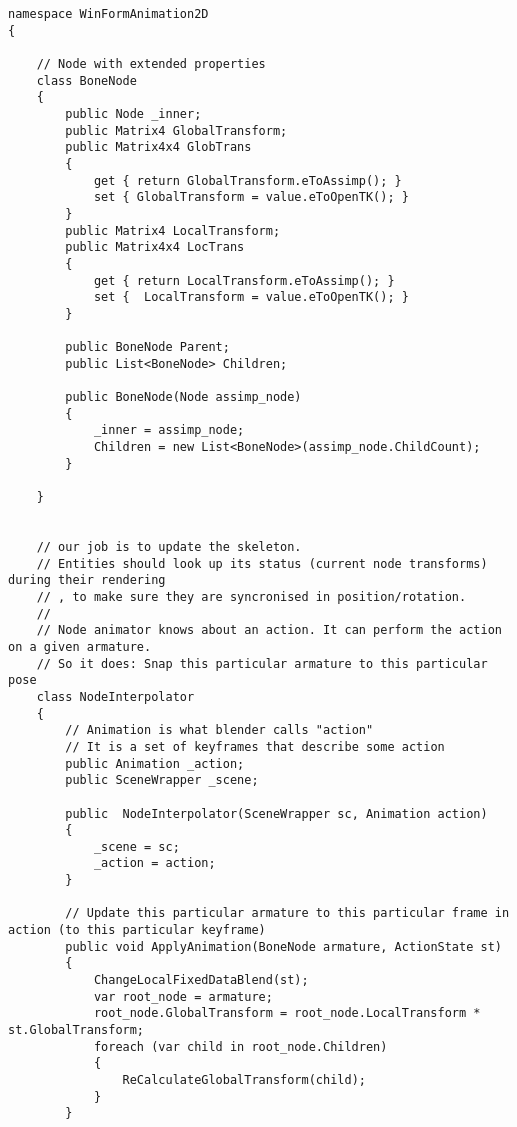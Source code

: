 \begin{scriptsize}
\begin{verbatim}
namespace WinFormAnimation2D
{

    // Node with extended properties
    class BoneNode
    {
        public Node _inner;
        public Matrix4 GlobalTransform;
        public Matrix4x4 GlobTrans
        {
            get { return GlobalTransform.eToAssimp(); }
            set { GlobalTransform = value.eToOpenTK(); }
        }
        public Matrix4 LocalTransform;
        public Matrix4x4 LocTrans
        {
            get { return LocalTransform.eToAssimp(); }
            set {  LocalTransform = value.eToOpenTK(); }
        }

        public BoneNode Parent;
        public List<BoneNode> Children;

        public BoneNode(Node assimp_node)
        {
            _inner = assimp_node;
            Children = new List<BoneNode>(assimp_node.ChildCount);
        }

    }


    // our job is to update the skeleton. 
    // Entities should look up its status (current node transforms) during their rendering
    // , to make sure they are syncronised in position/rotation.
    //
    // Node animator knows about an action. It can perform the action on a given armature.
    // So it does: Snap this particular armature to this particular pose
    class NodeInterpolator
    {
        // Animation is what blender calls "action"
        // It is a set of keyframes that describe some action
        public Animation _action;
        public SceneWrapper _scene;

        public  NodeInterpolator(SceneWrapper sc, Animation action)
        {
            _scene = sc;
            _action = action;
        }

        // Update this particular armature to this particular frame in action (to this particular keyframe)
        public void ApplyAnimation(BoneNode armature, ActionState st)
        {
            ChangeLocalFixedDataBlend(st);
            var root_node = armature;
            root_node.GlobalTransform = root_node.LocalTransform * st.GlobalTransform;
            foreach (var child in root_node.Children)
            {
                ReCalculateGlobalTransform(child);
            }
        }


\end{verbatim}
\end{scriptsize}

